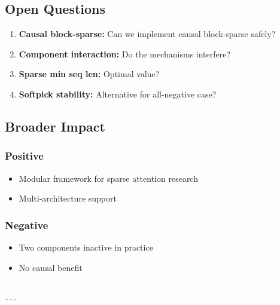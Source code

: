 \subsection{Open Questions}

\begin{enumerate}
\item \textbf{Causal block-sparse:} Can we implement causal block-sparse safely?
\item \textbf{Component interaction:} Do the mechanisms interfere?
\item \textbf{Sparse min seq len:} Optimal value?
\item \textbf{Softpick stability:} Alternative for all-negative case?

\end{enumerate}
\subsection{Broader Impact}

\subsubsection{Positive}
\begin{itemize}
\item Modular framework for sparse attention research
\item Multi-architecture support

\end{itemize}
\subsubsection{Negative}
\begin{itemize}
\item Two components inactive in practice
\item No causal benefit
\end{itemize}
\begin{lstlisting}

---
\end{lstlisting}
